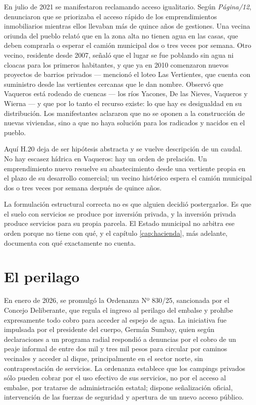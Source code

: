 En julio de 2021 se manifestaron reclamando acceso igualitario. Según \textit{Página/12}, denunciaron que se priorizaba el acceso rápido de los emprendimientos inmobiliarios mientras ellos llevaban más de quince años de gestiones. Una vecina oriunda del pueblo relató que en la zona alta no tienen agua en las casas, que deben comprarla o esperar el camión municipal dos o tres veces por semana. Otro vecino, residente desde 2007, señaló que el lugar se fue poblando sin agua ni cloacas para los primeros habitantes, y que ya en 2010 comenzaron nuevos proyectos de barrios privados --- mencionó el loteo Las Vertientes, que cuenta con suministro desde las vertientes cercanas que le dan nombre. Observó que Vaqueros está rodeado de cuencas --- los ríos Yacones, De las Nieves, Vaqueros y Wierna --- y que por lo tanto el recurso existe: lo que hay es desigualdad en su distribución. Los manifestantes aclararon que no se oponen a la construcción de nuevas viviendas, sino a que no haya solución para los radicados y nacidos en el pueblo.

Aquí H.20 deja de ser hipótesis abstracta y se vuelve descripción de un caudal. No hay escasez hídrica en Vaqueros: hay un orden de prelación. Un emprendimiento nuevo resuelve su abastecimiento desde una vertiente propia en el plazo de su desarrollo comercial; un vecino histórico espera el camión municipal dos o tres veces por semana después de quince años.

La formulación estructural correcta no es que alguien decidió postergarlos. Es que el suelo con servicios se produce por inversión privada, y la inversión privada produce servicios para su propia parcela. El Estado municipal no arbitra ese orden porque no tiene con qué, y el capítulo \ref{cap:hacienda}, más adelante, documenta con qué exactamente no cuenta.

\section{El perilago}

En enero de 2026, se promulgó la Ordenanza Nº 830/25, sancionada por el Concejo Deliberante, que regula el ingreso al perilago del embalse y prohíbe expresamente todo cobro para acceder al espejo de agua. La iniciativa fue impulsada por el presidente del cuerpo, Germán Sumbay, quien según declaraciones a un programa radial respondió a denuncias por el cobro de un peaje informal de entre dos mil y tres mil pesos para circular por caminos vecinales y acceder al dique, principalmente en el sector norte, sin contraprestación de servicios. La ordenanza establece que los campings privados sólo pueden cobrar por el uso efectivo de sus servicios, no por el acceso al embalse, por tratarse de administración estatal; dispone señalización oficial, intervención de las fuerzas de seguridad y apertura de un nuevo acceso público.

